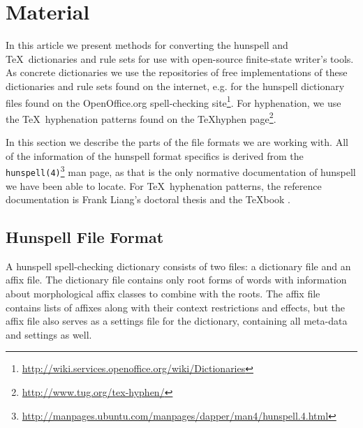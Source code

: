 \documentclass[a4paper,conference]{IEEEtran}
\begin{document}
\section{Material}
\label{sec:material}

In this article we present methods for converting the hunspell and
\TeX\ dictionaries and rule sets for use with open-source finite-state
writer's tools.  As concrete dictionaries we use the repositories of
free implementations of these dictionaries and rule sets found on the
internet, e.g. for the hunspell dictionary files found on the
OpenOffice.org spell-checking
site\footnote{\url{http://wiki.services.openoffice.org/wiki/Dictionaries}}.
For hyphenation, we use the \TeX\ hyphenation patterns found on the
\TeX hyphen page\footnote{\url{http://www.tug.org/tex-hyphen/}}.

In this section we describe the parts of the file formats we are
working with. All of the information of the hunspell format specifics
is derived from the
\texttt{hunspell(4)}\footnote{\url{http://manpages.ubuntu.com/manpages/dapper/man4/hunspell.4.html}}
man page, as that is the only normative documentation of hunspell we
have been able to locate. For \TeX\ hyphenation patterns, the
reference documentation is Frank Liang's doctoral thesis
\cite{liang/1983} and the \TeX book \cite{knuth/1986}.

\subsection{Hunspell File Format}
\label{subsec:material-hunspell}

A hunspell spell-checking dictionary consists of two files: a
dictionary file and an affix file. The dictionary file contains only
root forms of words with information about morphological affix classes
to combine with the roots.  The affix file contains lists of affixes
along with their context restrictions and effects, but the affix file
also serves as a settings file for the dictionary, containing all
meta-data and settings as well.
\end{document}
